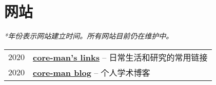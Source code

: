 \section*{网站}

\textit{*年份表示网站建立时间。所有网站目前仍在维护中。}

\begin{tabular}{p{} p{}}
2020 &	\textbf{\href{https://core-man.github.io/link/}{core-man's links}} -- 日常生活和研究的常用链接 \\
2020 &	\textbf{\href{https://core-man.github.io/blog/}{core-man blog}} -- 个人学术博客 \\
\end{tabular}
